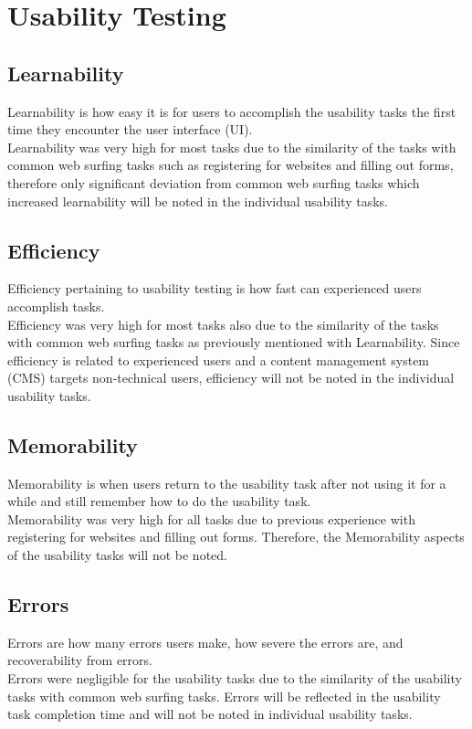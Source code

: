 \documentclass[12pt]{article}
\begin{document}
\section{Usability Testing}

\subsection{Learnability}
Learnability is how easy it is for users to accomplish the usability tasks the first time they encounter the user interface (UI).\\
Learnability was very high for most tasks due to the similarity of the tasks with common web surfing tasks such as registering for websites and filling out forms, therefore only significant deviation from common web surfing tasks which increased learnability will be noted in the individual usability tasks.

\subsection{Efficiency}
Efficiency pertaining to usability testing is how fast can experienced users accomplish tasks. \\
Efficiency was very high for most tasks also due to the similarity of the tasks with common web surfing tasks as previously mentioned with Learnability. Since efficiency is related to experienced users and a content management system (CMS) targets non-technical users, efficiency will not be noted in the individual usability tasks.   

\subsection{Memorability}

Memorability is when users return to the usability task after not using it for a while and still remember how to do the usability task.\\
Memorability was very high for all tasks due to previous experience with registering for websites and filling out forms. Therefore, the Memorability aspects of the usability tasks will not be noted.

\subsection{Errors}
Errors are how many errors users make, how severe the errors are, and recoverability from errors.\\
Errors were negligible for the usability tasks due to the similarity of the usability tasks with common web surfing tasks. Errors will be reflected in the usability task completion time and will not be noted in individual usability tasks.
\end{document}

